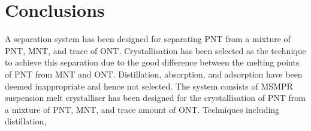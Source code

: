 \section{Conclusions}\label{separation conclusions}

A separation system has been designed for separating PNT from a mixture of PNT, MNT, and trace of ONT. Crystallisation has been selected as the technique to achieve this separation due to the good difference between the melting points of PNT from MNT and ONT. Distillation, absorption, and adsorption have been deemed inappropriate and hence not selected. The system consists of MSMPR suspension melt crystalliser has been designed for the crystallisation of PNT from a mixture of PNT, MNT, and trace amount of ONT. Techniques including distillation, 
